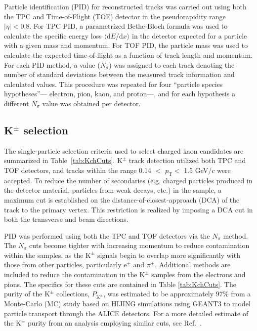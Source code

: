 \documentclass[ALICE,manyauthors]{cernphprep}
\newcommand{\pt}{$p_{\mathrm{T}}$\xspace}
\newcommand{\Kpm}{$\mathrm{K^{\pm}}$\xspace}
\begin{document}
Particle identification (PID) for reconstructed tracks was carried out using both the TPC and Time-of-Flight (TOF) detector \cite{Abelev:2014ffa, Akindinov:2013tea} in the pseudorapidity range $|\eta| < 0.8$.  
For TPC PID, a parametrized Bethe-Bloch formula was used to calculate the specific energy loss $\langle \mathrm{d}E/\mathrm{d}x \rangle$ in the detector expected for a particle with a given mass and momentum.  
For TOF PID, the particle mass was used to calculate the expected time-of-flight as a function of track length and momentum.  
For each PID method, a value ($N_{\sigma}$) was assigned to each track denoting the number of standard deviations between the measured track information and calculated values.  
This procedure was repeated for four ``particle species hypotheses''--- electron, pion, kaon, and proton---, and for each hypothesis a different $N_{\sigma}$ value was obtained per detector.


\subsection{K$^{\pm}$ selection}
\label{sec:KchSelection}
The single-particle selection criteria used to select charged kaon candidates are summarized in Table~\ref{tab:KchCuts}.
\Kpm track detection utilized both TPC and TOF detectors, and tracks within the range 0.14 $<$ \pt $<$ 1.5 GeV/$c$ were accepted.
To reduce the number of secondaries (e.g. charged particles produced in the detector material, particles from weak decays, etc.) in the sample, a maximum cut is established on the distance-of-closest-approach (DCA) of the track to the primary vertex.
This restriction is realized by imposing a DCA cut in both the transverse and beam directions.

PID was performed using both the TPC and TOF detectors via the $N_{\sigma}$ method. 
The $N_{\sigma}$ cuts become tighter with increasing momentum to reduce contamination within the samples, as the \Kpm signals begin to overlap more significantly with those from other particles, particularly e$^{\pm}$ and $\pi^{\pm}$.
Additional methods are included to reduce the contamination in the \Kpm samples from the electrons and pions.  
The specifics for these cuts are contained in Table \ref{tab:KchCuts}.
The purity of the \Kpm collections, $P_{\mathrm{K}^{\pm}}$, was estimated to be approximately 97\% from a Monte-Carlo (MC) study based on HIJING \cite{PhysRevD.44.3501} simulations using GEANT3 \cite{Brun:1994aa} to model particle transport through the ALICE detectors. 
For a more detailed estimate of the \Kpm purity from an analysis employing similar cuts, see Ref.\ \cite{Acharya:2017qtq}.
\end{document}
